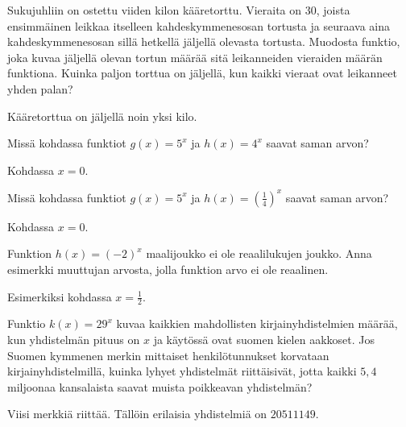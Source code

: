 \begin{tehtavasivu}
\begin{tehtava}
Sukujuhliin on ostettu viiden kilon kääretorttu. Vieraita on 30, joista ensimmäinen leikkaa itselleen kahdeskymmenesosan tortusta ja seuraava aina kahdeskymmenesosan sillä hetkellä jäljellä olevasta tortusta. Muodosta funktio, joka kuvaa jäljellä olevan tortun määrää sitä leikanneiden vieraiden määrän funktiona. Kuinka paljon torttua on jäljellä, kun kaikki vieraat ovat leikanneet yhden palan?
\begin{vastaus}
Kääretorttua on jäljellä noin yksi kilo.
\end{vastaus}
\end{tehtava}

\begin{tehtava}
Missä kohdassa funktiot $ g(x)=5^{x} $ ja $ h(x)=4^{x} $ saavat saman arvon?
\begin{vastaus}
Kohdassa $x = 0$.
\end{vastaus}
\end{tehtava}

\begin{tehtava}
Missä kohdassa funktiot $ g(x)=5^{x} $ ja $ h(x)=(\frac{1}{4})^{x} $ saavat saman arvon?
\begin{vastaus}
Kohdassa $x = 0$.
\end{vastaus}
\end{tehtava}

\begin{tehtava}
Funktion $ h(x)=(-2)^{x}$ maalijoukko ei ole reaalilukujen joukko. Anna esimerkki muuttujan arvosta, jolla funktion arvo ei ole reaalinen.
\begin{vastaus}
Esimerkiksi kohdassa $x = \frac{1}{2}$.
\end{vastaus}
\end{tehtava}

\begin{tehtava}
Funktio $ k(x)=29^{x}$ kuvaa kaikkien mahdollisten kirjainyhdistelmien määrää, kun yhdistelmän pituus on $ x $ ja käytössä ovat suomen kielen aakkoset. Jos Suomen kymmenen merkin mittaiset henkilötunnukset korvataan kirjainyhdistelmillä, kuinka lyhyet yhdistelmät riittäisivät, jotta kaikki $ 5,4 $ miljoonaa kansalaista saavat muista poikkeavan yhdistelmän?
\begin{vastaus}
Viisi merkkiä riittää. Tällöin erilaisia yhdistelmiä on $20511149$.
\end{vastaus}
\end{tehtava}


\end{tehtavasivu}
